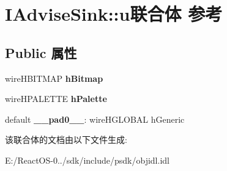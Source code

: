 \hypertarget{union_i_advise_sink_1_1u}{}\section{I\+Advise\+Sink\+:\+:u联合体 参考}
\label{union_i_advise_sink_1_1u}
\subsection*{Public 属性}
\begin{DoxyCompactItemize}
\item 
\mbox{\label{union_i_advise_sink_1_1u_a8031f87dca59914bbb1b425d05fa9169}} 
wire\+H\+B\+I\+T\+M\+AP {\bfseries h\+Bitmap}
\item 
\mbox{\label{union_i_advise_sink_1_1u_ae7d2c3ac352ddde7feb012985dc7924d}} 
wire\+H\+P\+A\+L\+E\+T\+TE {\bfseries h\+Palette}
\item 
\mbox{\label{union_i_advise_sink_1_1u_ab2787e4e62dc0b662ef6ccad960420cb}} 
default {\bfseries \+\_\+\+\_\+pad0\+\_\+\+\_\+}\+: wire\+H\+G\+L\+O\+B\+AL h\+Generic
\end{DoxyCompactItemize}


该联合体的文档由以下文件生成\+:\begin{DoxyCompactItemize}
\item 
E\+:/\+React\+O\+S-\/0../sdk/include/psdk/objidl.\+idl\end{DoxyCompactItemize}
